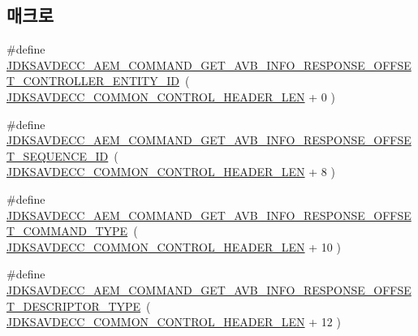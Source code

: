 \subsection*{매크로}
\begin{DoxyCompactItemize}
\item 
\#define \hyperlink{group__command__get__avb__info__response_gaf3d9d59d4ba4a2ac515ce70311fdcddd}{J\+D\+K\+S\+A\+V\+D\+E\+C\+C\+\_\+\+A\+E\+M\+\_\+\+C\+O\+M\+M\+A\+N\+D\+\_\+\+G\+E\+T\+\_\+\+A\+V\+B\+\_\+\+I\+N\+F\+O\+\_\+\+R\+E\+S\+P\+O\+N\+S\+E\+\_\+\+O\+F\+F\+S\+E\+T\+\_\+\+C\+O\+N\+T\+R\+O\+L\+L\+E\+R\+\_\+\+E\+N\+T\+I\+T\+Y\+\_\+\+ID}~( \hyperlink{group__jdksavdecc__avtp__common__control__header_gaae84052886fb1bb42f3bc5f85b741dff}{J\+D\+K\+S\+A\+V\+D\+E\+C\+C\+\_\+\+C\+O\+M\+M\+O\+N\+\_\+\+C\+O\+N\+T\+R\+O\+L\+\_\+\+H\+E\+A\+D\+E\+R\+\_\+\+L\+EN} + 0 )
\item 
\#define \hyperlink{group__command__get__avb__info__response_gaccb401394a3b34e5e1a3e17f086ab3e0}{J\+D\+K\+S\+A\+V\+D\+E\+C\+C\+\_\+\+A\+E\+M\+\_\+\+C\+O\+M\+M\+A\+N\+D\+\_\+\+G\+E\+T\+\_\+\+A\+V\+B\+\_\+\+I\+N\+F\+O\+\_\+\+R\+E\+S\+P\+O\+N\+S\+E\+\_\+\+O\+F\+F\+S\+E\+T\+\_\+\+S\+E\+Q\+U\+E\+N\+C\+E\+\_\+\+ID}~( \hyperlink{group__jdksavdecc__avtp__common__control__header_gaae84052886fb1bb42f3bc5f85b741dff}{J\+D\+K\+S\+A\+V\+D\+E\+C\+C\+\_\+\+C\+O\+M\+M\+O\+N\+\_\+\+C\+O\+N\+T\+R\+O\+L\+\_\+\+H\+E\+A\+D\+E\+R\+\_\+\+L\+EN} + 8 )
\item 
\#define \hyperlink{group__command__get__avb__info__response_ga14b889b211c801afe84c1b2852d93bba}{J\+D\+K\+S\+A\+V\+D\+E\+C\+C\+\_\+\+A\+E\+M\+\_\+\+C\+O\+M\+M\+A\+N\+D\+\_\+\+G\+E\+T\+\_\+\+A\+V\+B\+\_\+\+I\+N\+F\+O\+\_\+\+R\+E\+S\+P\+O\+N\+S\+E\+\_\+\+O\+F\+F\+S\+E\+T\+\_\+\+C\+O\+M\+M\+A\+N\+D\+\_\+\+T\+Y\+PE}~( \hyperlink{group__jdksavdecc__avtp__common__control__header_gaae84052886fb1bb42f3bc5f85b741dff}{J\+D\+K\+S\+A\+V\+D\+E\+C\+C\+\_\+\+C\+O\+M\+M\+O\+N\+\_\+\+C\+O\+N\+T\+R\+O\+L\+\_\+\+H\+E\+A\+D\+E\+R\+\_\+\+L\+EN} + 10 )
\item 
\#define \hyperlink{group__command__get__avb__info__response_ga1d48d08cf3954e6c32c63d30b4323a03}{J\+D\+K\+S\+A\+V\+D\+E\+C\+C\+\_\+\+A\+E\+M\+\_\+\+C\+O\+M\+M\+A\+N\+D\+\_\+\+G\+E\+T\+\_\+\+A\+V\+B\+\_\+\+I\+N\+F\+O\+\_\+\+R\+E\+S\+P\+O\+N\+S\+E\+\_\+\+O\+F\+F\+S\+E\+T\+\_\+\+D\+E\+S\+C\+R\+I\+P\+T\+O\+R\+\_\+\+T\+Y\+PE}~( \hyperlink{group__jdksavdecc__avtp__common__control__header_gaae84052886fb1bb42f3bc5f85b741dff}{J\+D\+K\+S\+A\+V\+D\+E\+C\+C\+\_\+\+C\+O\+M\+M\+O\+N\+\_\+\+C\+O\+N\+T\+R\+O\+L\+\_\+\+H\+E\+A\+D\+E\+R\+\_\+\+L\+EN} + 12 )

\end{DoxyCompactItemize}
